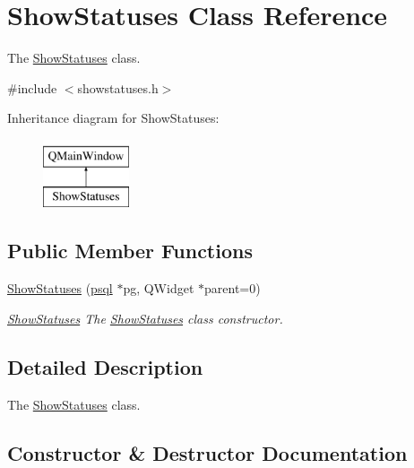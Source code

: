 \hypertarget{class_show_statuses}{}\section{Show\+Statuses Class Reference}
\label{class_show_statuses}


The \hyperlink{class_show_statuses}{Show\+Statuses} class.  




{\ttfamily \#include $<$showstatuses.\+h$>$}

Inheritance diagram for Show\+Statuses\+:\begin{figure}[H]
\begin{center}
\leavevmode
\includegraphics[height=2.000000cm]{class_show_statuses}
\end{center}
\end{figure}
\subsection*{Public Member Functions}
\begin{DoxyCompactItemize}
\item 
\hyperlink{class_show_statuses_ac0a8edde40369acc96487d9e4e7d2011}{Show\+Statuses} (\hyperlink{classpsql}{psql} $\ast$pg, Q\+Widget $\ast$parent=0)
\begin{DoxyCompactList}\small\item\em \hyperlink{class_show_statuses}{Show\+Statuses} The \hyperlink{class_show_statuses}{Show\+Statuses} class constructor. \end{DoxyCompactList}\end{DoxyCompactItemize}


\subsection{Detailed Description}
The \hyperlink{class_show_statuses}{Show\+Statuses} class. 

\subsection{Constructor \& Destructor Documentation}
\mbox{\label{class_show_statuses_ac0a8edde40369acc96487d9e4e7d2011}} 
